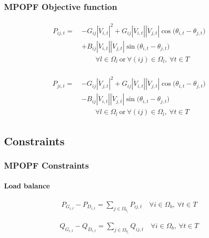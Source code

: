 \documentclass[
	11pt, %
	aspectratio=169, %
]{beamer}
\begin{document}

\begin{frame}
	\frametitle{MPOPF Objective function}

	\begin{align}
	\label{eq:Mexpr_p_flow_ij}
		\begin{split}
		P_{ij,t} =\ &-G_{ij} \left|\dot{V}_{i,t}\right|^2 
		+ G_{ij} \left|\dot{V}_{i,t}\right|\left|\dot{V}_{j,t}\right| \cos\big(\theta_{i,t}-\theta_{j,t}\big) \\
		&+ B_{ij} \left|\dot{V}_{i,t}\right|\left|\dot{V}_{j,t}\right| \sin\big(\theta_{i,t}-\theta_{j,t}\big) \\[1em]
		&\qquad \forall l \in \Omega_{l} \ \text{or} \ \forall (ij) \in \Omega_{l},\ \forall t \in T
		\end{split}
	\end{align}

	\begin{align}
	\label{eq:Mexpr_p_flow_ji}
		\begin{split}
		P_{ji,t} =\ &-G_{ij} \left|\dot{V}_{j,t}\right|^2 
		+ G_{ij} \left|\dot{V}_{i,t}\right|\left|\dot{V}_{j,t}\right| \cos\big(\theta_{i,t}-\theta_{j,t}\big) \\
		&- B_{ij} \left|\dot{V}_{i,t}\right|\left|\dot{V}_{j,t}\right| \sin\big(\theta_{i,t}-\theta_{j,t}\big) \\[1em]
		&\qquad \forall l \in \Omega_{l} \ \text{or} \ \forall (ij) \in \Omega_{l},\ \forall t \in T
		\end{split}
	\end{align}

\end{frame}


\subsection{Constraints}

\begin{frame}
	\frametitle{MPOPF Constraints}
	\label{frame:MPOFP_constraints}
	\framesubtitle{Load balance} %

	\begin{align}
	\label{eq:Mcons_load_bal_P}
		P_{G_{i,t}} - P_{D_{i,t}} = \sum_{j \in \Omega_{b_{i}}} P_{ij,t}  \quad \forall i \in \Omega_{b},\ \forall t \in T
	\end{align}

	\begin{align}
	\label{eq:Mcons_load_bal_Q}
		Q_{G_{i,t}} - Q_{D_{i,t}} = \sum_{j \in \Omega_{b_{i}}} Q_{ij,t}  \quad \forall i \in \Omega_{b},\ \forall t \in T
	\end{align}

\end{frame}
\end{document}
